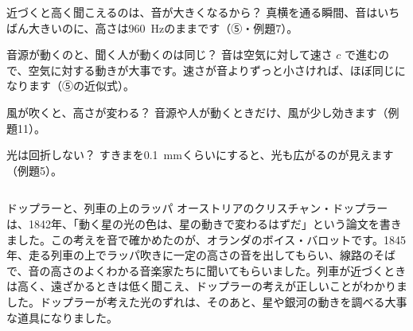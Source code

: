 \begin{tsumazuki}{近づくと高く聞こえるのは、音が大きくなるから？}
真横を通る瞬間、音はいちばん大きいのに、高さは\qty{960}{Hz}のままです（⑤・例題7）。
\end{tsumazuki}

\begin{tsumazuki}{音源が動くのと、聞く人が動くのは同じ？}
音は空気に対して速さ $c$ で進むので、空気に対する動きが大事です。速さが音よりずっと小さければ、ほぼ同じになります（⑤の近似式）。
\end{tsumazuki}

\begin{tsumazuki}{風が吹くと、高さが変わる？}
音源や人が動くときだけ、風が少し効きます（例題11）。
\end{tsumazuki}

\begin{tsumazuki}{光は回折しない？}
すきまを\qty{0.1}{mm}くらいにすると、光も広がるのが見えます（例題5）。
\end{tsumazuki}

\begin{column}{ドップラーと、列車の上のラッパ}
オーストリアのクリスチャン・ドップラーは、1842年、「動く星の光の色は、星の動きで変わるはずだ」という論文を書きました。この考えを音で確かめたのが、オランダのボイス・バロットです。1845年、走る列車の上でラッパ吹きに一定の高さの音を出してもらい、線路のそばで、音の高さのよくわかる音楽家たちに聞いてもらいました。列車が近づくときは高く、遠ざかるときは低く聞こえ、ドップラーの考えが正しいことがわかりました。ドップラーが考えた光のずれは、そのあと、星や銀河の動きを調べる大事な道具になりました。
\end{column}

